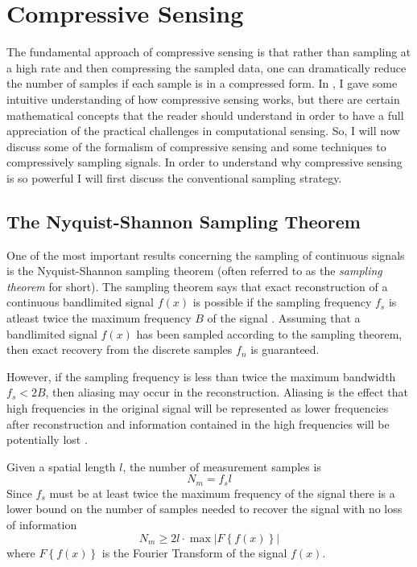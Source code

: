 \section{Compressive Sensing}\label{sec:compressiveSesing}

The fundamental approach of \gls{compressive sensing} is that rather than sampling at a high rate and then compressing the sampled data, one can dramatically reduce the number of samples if each sample is in a compressed form. In  , I gave some intuitive understanding of how \gls{compressive sensing} works, but there are certain mathematical concepts that the reader should understand in order to have a full appreciation of the practical challenges in computational sensing. So, I will now discuss some of the formalism of compressive sensing and some techniques to compressively sampling signals. In order to understand why compressive sensing is so powerful I will first discuss the conventional sampling strategy.

\subsection{The Nyquist-Shannon Sampling Theorem}

One of the most important results concerning the \gls{sampling} of continuous signals is the Nyquist-Shannon sampling theorem (often referred to as the \emph{sampling theorem} for short). The sampling theorem says that exact reconstruction of a continuous \gls{bandlimited signal} $f(x)$ is possible if the sampling frequency $f_s$ is atleast twice the maximum frequency $ B $ of the signal \cite{shannon1949communication}. Assuming that a bandlimited signal $f(x)$ has been sampled according to the sampling theorem, then exact recovery from the discrete samples $f_n$ is guaranteed.

However, if the sampling frequency is less than twice the maximum bandwidth $f_s < 2B$, then aliasing may occur in the reconstruction. Aliasing is the effect that high frequencies in the original signal will be represented as lower frequencies after reconstruction and information contained in the high frequencies will be potentially lost \cite{proakis1988introduction}. 

Given a spatial length $l$, the number of measurement samples is
\begin{equation}
	N_m = f_s l
\end{equation}
Since $f_s$ must be at least twice the maximum frequency of the signal there is a lower bound on the number of samples needed to recover the signal with no loss of information
\begin{equation}
	N_m \geq 2 l \cdot \max \left| F\left\{ f\left( x\right) \right\} \right|
\end{equation}
%
where $F\left\{ f\left( x\right) \right\} $ is the Fourier Transform of the signal $f(x)$.

